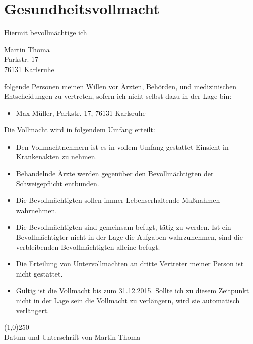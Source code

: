 \documentclass[a4paper]{scrartcl}
\newcommand{\Vollmachtgeber}{Martin Thoma}                          %
\newcommand{\VollmachtgeberAnschrift}{Parkstr. 17}                  %
\newcommand{\VollmachtgeberOrt}{76131 Karlsruhe}                    %
\newcommand{\Vollmachtempfaenger}{Max Müller}                       %
\newcommand{\VollmachtempfaengerAnschrift}{Parkstr. 17}             %
\newcommand{\VollmachtempfaengerOrt}{76131 Karlsruhe}               %
\begin{document}
\section*{Gesundheitsvollmacht}
Hiermit bevollmächtige ich

\Vollmachtgeber\\
\VollmachtgeberAnschrift\\
\VollmachtgeberOrt

folgende Personen meinen Willen vor Ärzten, Behörden, und medizinischen
Entscheidungen zu vertreten, sofern ich nicht selbst dazu in der Lage bin:

\begin{itemize}
  \item \Vollmachtempfaenger, \VollmachtempfaengerAnschrift, \VollmachtempfaengerOrt
\end{itemize}

Die Vollmacht wird in folgendem Umfang erteilt:

\begin{itemize}
  \item Den Vollmachtnehmern ist es in vollem Umfang gestattet Einsicht in 
        Krankenakten zu nehmen.
  \item Behandelnde Ärzte werden gegenüber den Bevollmächtigten der
        Schweigepflicht entbunden.
  \item Die Bevollmächtigten sollen immer Lebenserhaltende Maßnahmen wahrnehmen.
  \item Die Bevollmächtigten sind gemeinsam befugt, tätig zu werden. Ist ein
        Bevollmächtigter nicht in der Lage die Aufgaben wahrzunehmen, sind die 
        verbleibenden Bevollmächtigten alleine befugt.
  \item Die Erteilung von Untervollmachten an dritte Vertreter meiner Person
        ist nicht gestattet.
  \item Gültig ist die Vollmacht bis zum 31.12.2015. Sollte ich zu diesem
        Zeitpunkt nicht in der Lage sein die Vollmacht zu verlängern, wird sie
        automatisch verlängert.
\end{itemize}

\vspace{1.5cm}
\line(1,0){250}\\
\vspace{-0.3cm}
{\scriptsize Datum und Unterschrift von \Vollmachtgeber}\\
\end{document}
